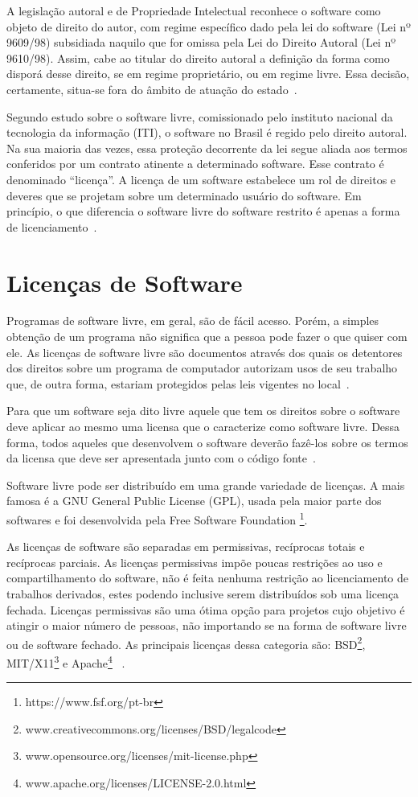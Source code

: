 A legislação autoral e de Propriedade Intelectual reconhece o software como objeto 
de direito do autor, com regime específico dado pela lei do software (Lei nº 9609/98)
subsidiada naquilo que for omissa pela Lei do Direito Autoral (Lei nº 9610/98).
%
Assim, cabe ao titular do direito autoral a definição da forma como disporá desse
direito, se em regime proprietário, ou em regime livre. Essa decisão, certamente,
situa-se fora do âmbito de atuação do estado~\cite{junior2005software}.

Segundo estudo sobre o software livre, comissionado pelo instituto nacional da 
tecnologia da informação (ITI), o software no Brasil é regido pelo direito autoral. 
Na sua maioria das vezes, essa proteção decorrente da lei segue aliada aos termos 
conferidos por um contrato atinente a determinado software. Esse contrato é 
denominado ``licença''. A licença de um software estabelece um rol de direitos e 
deveres que se projetam sobre um determinado usuário do software. Em princípio, 
o que diferencia o software livre do software restrito é apenas a forma de
licenciamento~\cite{kon2012software}.


\section{Licenças de Software}

Programas de software livre, em geral, são de fácil acesso. Porém, a simples obtenção
de um programa não significa que a pessoa pode fazer o que quiser com ele. As licenças
de software livre são documentos através dos quais os detentores dos direitos sobre um
programa de computador autorizam usos de seu trabalho que, de outra forma, estariam
protegidos pelas leis vigentes no local~\cite{sabino2009licenccas}.

Para que um software seja dito livre aquele que tem os direitos sobre o software
deve aplicar ao mesmo uma licensa que o caracterize como software livre. Dessa 
forma, todos aqueles que desenvolvem o software deverão fazê-los sobre os termos
da licensa que deve ser apresentada junto com o código fonte~\cite{sabino2009licenccas}.

Software livre pode ser distribuído em uma grande variedade de licenças.
A mais famosa é a GNU General Public License (GPL), usada pela maior
parte dos softwares e foi desenvolvida pela Free Software Foundation \footnote{https://www.fsf.org/pt-br}.

As licenças de software são separadas em permissivas, recíprocas totais e recíprocas
parciais.
%
As licenças permissivas impõe poucas restrições ao uso e compartilhamento do
software, não é feita nenhuma restrição ao licenciamento de trabalhos derivados, 
estes podendo inclusive serem distribuídos sob uma licença fechada. Licenças permissivas são 
uma ótima opção para projetos cujo objetivo é atingir o maior número de pessoas, 
não importando se na forma de software livre ou de software fechado. As principais 
licenças dessa categoria são: BSD\footnote{www.creativecommons.org/licenses/BSD/legalcode},
MIT/X11\footnote{www.opensource.org/licenses/mit-license.php} e Apache\footnote{www.apache.org/licenses/LICENSE-2.0.html}
~\cite{sabino2009licenccas}.

